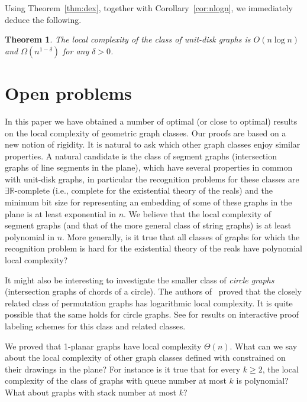 \documentclass[a4paper,reqno, 12pt]{amsart}
\newtheorem{theorem}{Theorem}[section]
\begin{document}
Using Theorem~\ref{thm:dex}, together with Corollary~\ref{cor:nlogn}, we immediately deduce the following.



\begin{theorem}
The local complexity of the class of unit-disk
graphs is $O(n\log n)$ and $\Omega(n^{1-\delta})$ for any $\delta>0$.
\end{theorem}

\section{Open problems}\label{sec:ccl}
 In this paper we have obtained a number of optimal (or close to
 optimal) results on the local complexity of geometric graph
 classes. Our proofs are based on a new notion of rigidity. It is
 natural to ask which other graph classes enjoy similar
 properties. A natural candidate is the class of segment graphs
 (intersection graphs of line segments in the plane), which have
 several properties in common with unit-disk graphs, in particular the
 recognition problems for these classes are $\exists
 \mathbb{R}$-complete (i.e., complete for the existential theory of
 the reals) and the minimum bit size for representing an embedding of
 some of these
 graphs in the plane is at least exponential in $n$. We believe
 that the local complexity of segment graphs (and that of the more
 general class of string graphs) is at least polynomial in $n$. More generally, is it true that all classes of graphs for which the
 recognition problem is hard for the
 existential theory of the reals have polynomial local complexity?

 It might also be interesting to investigate the smaller class of 
 \emph{circle graphs} (intersection graphs of chords of a circle).
 The authors of~\cite{JMR23} proved that the closely related class of
 permutation graphs has logarithmic local complexity. It is quite
 possible that the same holds for circle graphs. See \cite{JMR22} for
 results on interactive proof labeling schemes for this class and
 related classes.


 \medskip

 We proved that 1-planar graphs have local complexity $\Theta(n)$.
What can we say about the local complexity of other graph classes
defined with constrained on their drawings in the plane? For instance
is it true that for every $k\ge 2$, the local complexity of the class of
graphs with queue number at most $k$ is polynomial? What about graphs
with stack number at most $k$?
\end{document}
